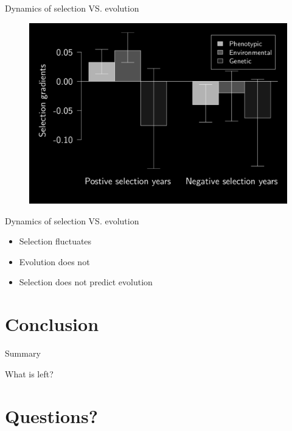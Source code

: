 \documentclass[10pt]{beamer}%
\begin{document}
\begin{frame}{Dynamics of selection VS. evolution}
	\begin{figure}
		\includegraphics[width=\textwidth]{Figures/Betas-1}
	\end{figure}
\end{frame} 

\begin{frame}{Dynamics of selection VS. evolution}

	\begin{itemize}[<+->]
		\item Selection fluctuates
		\item Evolution does not
		\item Selection does not predict evolution
	\end{itemize}
	
\end{frame}


\section{Conclusion}
\begin{frame}{Summary}

\end{frame}
\begin{frame}{What is left?}

\end{frame}

\section{Questions?}
\end{document}
